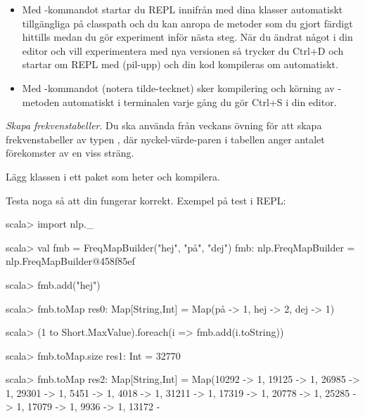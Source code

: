 \begin{itemize}
  \item
    Med -kommandot  startar du REPL innifrån  med dina klasser automatiskt  tillgängliga på classpath och du kan anropa de metoder som du gjort färdigt hittills medan du gör experiment inför nästa steg. När du ändrat något i din editor och vill experimentera med nya versionen så trycker du Ctrl+D och startar om REPL med  (pil-upp) och din kod kompileras om automatiskt.
  \item
    Med -kommandot  (notera tilde-tecknet) sker kompilering och körning av -metoden automatiskt i terminalen varje gång du gör Ctrl+S i din editor.

\end{itemize}


\Task \emph{Skapa frekvenstabeller}. Du ska använda  från veckans övning för att skapa frekvenstabeller av typen , där nyckel-värde-paren i tabellen anger antalet förekomster av en viss sträng.

\Subtask Lägg klassen  i ett paket som heter  och kompilera.

\begin{figure}[H]
\end{figure}

\Subtask Testa noga så att din  fungerar korrekt. Exempel på test i REPL:
\begin{REPL}
scala> import nlp._

scala> val fmb = FreqMapBuilder("hej", "på", "dej")
fmb: nlp.FreqMapBuilder = nlp.FreqMapBuilder@458f85ef

scala> fmb.add("hej")

scala> fmb.toMap
res0: Map[String,Int] = Map(på -> 1, hej -> 2, dej -> 1)

scala> (1 to Short.MaxValue).foreach(i => fmb.add(i.toString))

scala> fmb.toMap.size
res1: Int = 32770

scala> fmb.toMap
res2: Map[String,Int] = Map(10292 -> 1, 19125 -> 1, 26985 -> 1, 29301 -> 1, 5451 -> 1, 4018 -> 1, 31211 -> 1, 17319 -> 1, 20778 -> 1, 25285 -> 1, 17079 -> 1, 9936 -> 1, 13172 -
\end{REPL}

